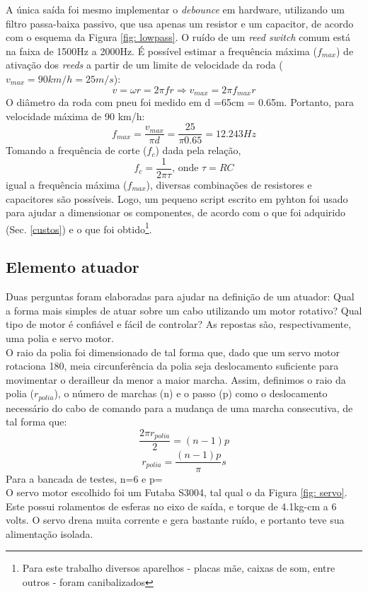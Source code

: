 \documentclass[a4paper,11pt]{article}
\begin{document}
A única saída foi mesmo implementar o \textit{debounce} em hardware, utilizando um filtro passa-baixa passivo, que usa apenas um resistor e um capacitor, de acordo com o esquema da Figura \ref{fig: lowpass}. O ruído de um \textit{reed switch} comum está na faixa de 1500Hz a 2000Hz\cite{reed}. É possível estimar a frequência máxima ($f_{max}$) de ativação dos \textit{reeds} a partir de um limite de velocidade da roda ($v_{max} = 90 km/h = 25 m/s$):
\begin{equation}
  v = \omega r = 2\pi f r \Rightarrow v_{max} = 2\pi f_{max} r
\end{equation}
O diâmetro da roda com pneu foi medido em d =65cm = 0.65m. Portanto, para velocidade máxima de 90 km/h:
\begin{equation}
  f_{max} = \frac{\displaystyle v_{max}}{\displaystyle \pi d} =
\frac{\displaystyle 25}{\displaystyle \pi 0.65} = 12.243 Hz
\end{equation}
Tomando a frequência de corte ($f_{c}$) dada pela relação,
\begin{equation}
  f_{c} = \frac{\displaystyle 1}{\displaystyle 2\pi\tau} \text{, onde } \tau =
RC
\end{equation}
igual a frequência máxima ($f_{max}$), diversas combinações de resistores e capacitores são possíveis. Logo, um pequeno script escrito em pyhton\cite{python} foi usado para ajudar a dimensionar os componentes, de acordo com o que foi adquirido (Sec. \ref{custos}) e o que foi obtido\footnote{Para este trabalho diversos aparelhos - placas mãe, caixas de som, entre outros -  foram canibalizados}.


%
\subsection{Elemento atuador}
\label{atuador}
Duas perguntas foram elaboradas para ajudar na definição de um atuador: Qual a
forma mais simples de atuar sobre um cabo utilizando um motor rotativo? Qual
tipo de motor é confiável e fácil de controlar? As repostas são,
respectivamente, uma polia e servo motor. \\
O raio da polia foi dimensionado de tal forma que, dado que um servo motor
rotaciona 180\textdegree, meia circunferência da polia seja deslocamento
suficiente para movimentar o derailleur da menor a maior marcha. Assim,
definimos o raio da polia ($r_{polia}$), o número de marchas (n) e o passo (p)
como o deslocamento necessário do cabo de comando para a mudança de uma marcha
consecutiva, de tal forma que:
\begin{equation*}
  \frac{\displaystyle 2\pi r_{polia} }{\displaystyle 2} = (n-1)p
\end{equation*}
\begin{equation}
  r_{polia} = \frac{\displaystyle (n-1)p}{\displaystyle \pi}s
\end{equation} 
Para a bancada de testes, n=6 e p=%
\\O servo motor escolhido foi um Futaba S3004, tal qual o da Figura \ref{fig: servo}. Este possui rolamentos de esferas no eixo de saída, e torque de 4.1kg-cm a 6 volts. O servo drena muita corrente e gera bastante ruído, e portanto teve sua alimentação isolada.
\end{document}
